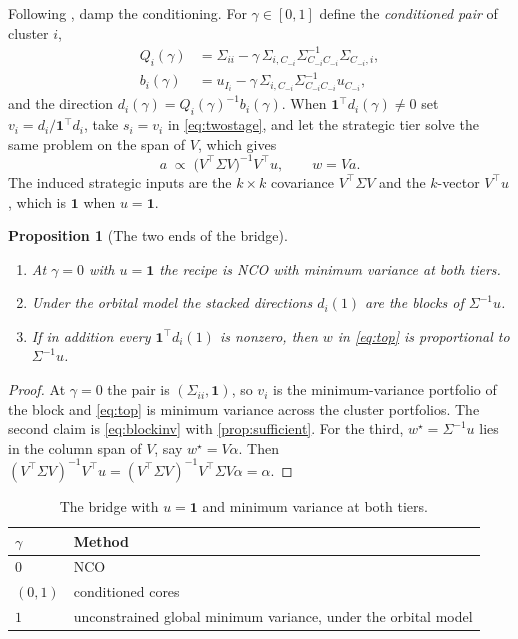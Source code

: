 \documentclass[11pt]{article}
\newcommand{\ones}{\mathbf{1}}
\newtheorem{proposition}{Proposition}
\begin{document}
Following \textcite{cotton2024schur}, damp the conditioning. For
$\gamma\in[0,1]$ define the \emph{conditioned pair} of cluster $i$,
\begin{equation}
\begin{aligned}
  Q_i(\gamma) &= \Sigma_{ii}-\gamma\,\Sigma_{i,C_{-i}}\Sigma_{C_{-i}C_{-i}}^{-1}\Sigma_{C_{-i},i},\\
  b_i(\gamma) &= u_{I_i}-\gamma\,\Sigma_{i,C_{-i}}\Sigma_{C_{-i}C_{-i}}^{-1}u_{C_{-i}},
\end{aligned}
  \label{eq:pair}
\end{equation}
and the direction $d_i(\gamma)=Q_i(\gamma)^{-1}b_i(\gamma)$. When
$\ones^\top d_i(\gamma)\neq0$ set $v_i=d_i/\ones^\top d_i$, take $s_i=v_i$
in \eqref{eq:twostage}, and let the strategic tier solve the same problem
on the span of $V$, which gives
\begin{equation}
  a \;\propto\; \big(V^\top\Sigma V\big)^{-1}V^\top u,
  \qquad w = Va .
  \label{eq:top}
\end{equation}
The induced strategic inputs are the $k\times k$ covariance $V^\top\Sigma V$
and the $k$-vector $V^\top u$, which is $\ones$ when $u=\ones$.

\begin{proposition}[The two ends of the bridge]
\label{prop:bridge}
\leavevmode
\begin{enumerate}
\item At $\gamma=0$ with $u=\ones$ the recipe is NCO with minimum variance
  at both tiers.
\item Under the orbital model the stacked directions $d_i(1)$ are the blocks
  of $\Sigma^{-1}u$.
\item If in addition every $\ones^\top d_i(1)$ is nonzero, then $w$ in
  \eqref{eq:top} is proportional to $\Sigma^{-1}u$.
\end{enumerate}
\end{proposition}

\begin{proof}
At $\gamma=0$ the pair is $(\Sigma_{ii},\ones)$, so $v_i$ is the
minimum-variance portfolio of the block and \eqref{eq:top} is minimum
variance across the cluster portfolios. The second claim is
\eqref{eq:blockinv} with \cref{prop:sufficient}. For the third,
$w^\star=\Sigma^{-1}u$ lies in the column span of $V$, say
$w^\star=V\alpha$. Then
$(V^\top\Sigma V)^{-1}V^\top u
=(V^\top\Sigma V)^{-1}V^\top\Sigma V\alpha=\alpha$.
\end{proof}

\begin{table}[ht]
\centering
\begin{tabular}{@{}ll@{}}
\toprule
$\gamma$ & Method \\
\midrule
$0$ & NCO \parencite{lopezdeprado2020} \\
$(0,1)$ & conditioned cores \\
$1$ & unconstrained global minimum variance, under the orbital model \\
\bottomrule
\end{tabular}
\caption{The bridge with $u=\ones$ and minimum variance at both tiers.}
\label{tab:bridge}
\end{table}
\end{document}
